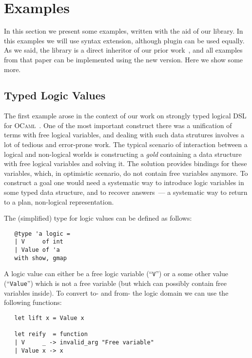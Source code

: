 \section{Examples}

In this section we present some examples, written with the aid of our library. In this examples we will use  syntax extension,
although  plugin can be used equally. As we said, the library is a direct inheritor of our prior work~\cite{TransformationObjects}, and
all examples from that paper can be implemented using the new version. Here we show some more.

\subsection{Typed Logic Values}

The first example arose in the context of our work on strongly typed logical DSL for \textsc{OCaml}~\cite{OCanren}. One of the
most important construct there was a unification of terms with free logical variables, and dealing with such data strutures
involves a lot of tedious and error-prone work. The typical scenario of interaction between a logical and non-logical worlds
is constructing a \emph{gold} containing a data structure with free logical variables and solving it. The solution
provides bindings for these variables, which, in optimistic scenario, do not contain free variables anymore. To construct
a goal one would need a systematic way to introduce logic variables in some typed data structure, and to recover answers~---
a systematic way to return to a plan, non-logical representation.

The (simplified) type for logic values can be defined as follows:

\begin{lstlisting}
   @type 'a logic =
   | V     of int
   | Value of 'a
   with show, gmap
\end{lstlisting}

A logic value can either be a free logic variable (``\lstinline{V}'') or a some other value (``\lstinline{Value}'') which is not
a free variable (but which can possibly contain free variables inside). To convert to- and from- the logic domain we can use the following
functions:

\begin{lstlisting}
   let lift x = Value x
  
   let reify  = function
   | V     _ -> invalid_arg "Free variable"
   | Value x -> x
\end{lstlisting}

